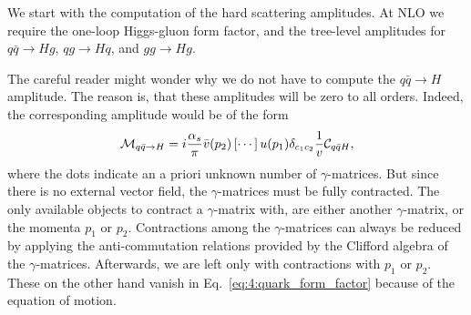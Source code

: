 We start with the computation of the hard scattering amplitudes. At \acs{NLO} we require the one-loop Higgs-gluon form factor, and the tree-level amplitudes for $q \bar{q} \rightarrow H g$, $q g \rightarrow H q$, and $g g \rightarrow H g$.

The careful reader might wonder why we do not have to compute the $q \bar{q} \rightarrow H$ amplitude. The reason is, that these amplitudes will be zero to all orders. Indeed, the corresponding amplitude would be of the form
\begin{equation}
\mathcal{M}_{q \bar{q} \rightarrow H} = i \frac{\alpha_s}{\pi} \bar{v}(p_2) \left[ \cdots \right] u(p_1) \delta_{c_1 c_2} \frac{1}{v} \mathcal{C}_{q \bar{q} H},
\label{eq:4:quark_form_factor}
\end{equation}
where the dots indicate an a priori unknown number of $\gamma$-matrices. But since there is no external vector field, the $\gamma$-matrices must be fully contracted. The only available objects to contract a $\gamma$-matrix with, are either another $\gamma$-matrix, or the momenta $p_1$ or $p_2$. Contractions among the $\gamma$-matrices can always be reduced by applying the anti-commutation relations provided by the Clifford algebra of the $\gamma$-matrices. Afterwards, we are left only with contractions with $p_1$ or $p_2$. These on the other hand vanish in Eq.~\eqref{eq:4:quark_form_factor} because of the equation of motion.

